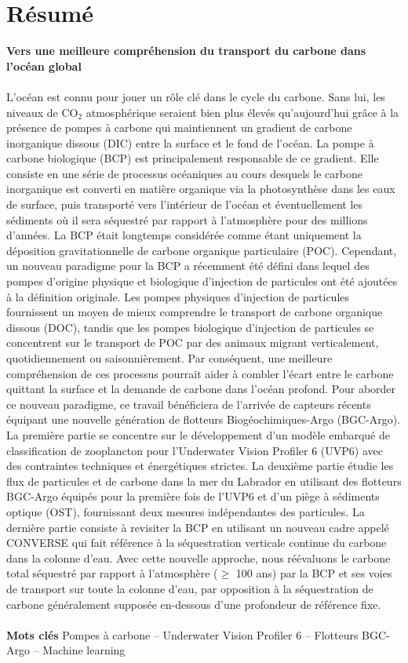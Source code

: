 \documentclass[a4paper]{report}
\begin{document}
\newpage

\section*{Résumé}

\textbf{Vers une meilleure compréhension du transport du carbone dans l'océan global}\\
\\
L'océan est connu pour jouer un rôle clé dans le cycle du carbone. Sans lui, les niveaux de CO$_{2}$ atmosphérique seraient bien plus élevés qu'aujourd'hui grâce à la présence de pompes à carbone qui maintiennent un gradient de carbone inorganique dissous (DIC) entre la surface et le fond de l'océan. La pompe à carbone biologique (BCP) est principalement responsable de ce gradient. Elle consiste en une série de processus océaniques au cours desquels le carbone inorganique est converti en matière organique via la photosynthèse dans les eaux de surface, puis transporté vers l'intérieur de l'océan et éventuellement les sédiments où il sera séquestré par rapport à l'atmosphère pour des millions d'années. La BCP était longtemps considérée comme étant uniquement la déposition gravitationnelle de carbone organique particulaire (POC). Cependant, un nouveau paradigme pour la BCP a récemment été défini dans lequel des pompes d'origine physique et biologique d'injection de particules ont été ajoutées à la définition originale. Les pompes physiques d'injection de particules fournissent un moyen de mieux comprendre le transport de carbone organique dissous (DOC), tandis que les pompes biologique d'injection de particules se concentrent sur le transport de POC par des animaux migrant verticalement, quotidiennement ou saisonnièrement. Par conséquent, une meilleure compréhension de ces processus pourrait aider à combler l'écart entre le carbone quittant la surface et la demande de carbone dans l'océan profond. Pour aborder ce nouveau paradigme, ce travail bénéficiera de l'arrivée de capteurs récents équipant une nouvelle génération de flotteurs Biogéochimiques-Argo (BGC-Argo). La première partie se concentre sur le développement d'un modèle embarqué de classification de zooplancton pour l'Underwater Vision Profiler 6 (UVP6) avec des contraintes techniques et énergétiques strictes. La deuxième partie étudie les flux de particules et de carbone dans la mer du Labrador en utilisant des flotteurs BGC-Argo équipés pour la première fois de l'UVP6 et d'un piège à sédiments optique (OST), fournissant deux mesures indépendantes des particules. La dernière partie consiste à revisiter la BCP en utilisant un nouveau cadre appelé CONVERSE qui fait référence à la séquestration verticale continue du carbone dans la colonne d'eau. Avec cette nouvelle approche, nous réévaluons le carbone total séquestré par rapport à l'atmosphère ($\geq$ 100 ans) par la BCP et ses voies de transport sur toute la colonne d'eau, par opposition à la séquestration de carbone généralement supposée en-dessous d'une profondeur de référence fixe.\\
\\
\textbf{Mots clés} Pompes à carbone -- Underwater Vision Profiler 6 -- Flotteurs BGC-Argo -- Machine learning

\newpage
\thispagestyle{empty}
\null
\end{document}
